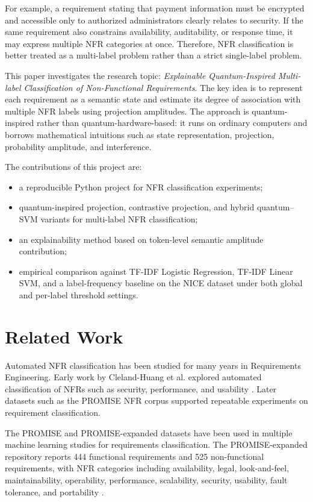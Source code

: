 \documentclass[conference]{IEEEtran}
\begin{document}
For example, a requirement stating that payment information must be encrypted and accessible only to authorized administrators clearly relates to security. If the same requirement also constrains availability, auditability, or response time, it may express multiple NFR categories at once. Therefore, NFR classification is better treated as a multi-label problem rather than a strict single-label problem.

This paper investigates the research topic: \emph{Explainable Quantum-Inspired Multi-label Classification of Non-Functional Requirements}. The key idea is to represent each requirement as a semantic state and estimate its degree of association with multiple NFR labels using projection amplitudes. The approach is quantum-inspired rather than quantum-hardware-based: it runs on ordinary computers and borrows mathematical intuitions such as state representation, projection, probability amplitude, and interference.

The contributions of this project are:
\begin{itemize}
    \item a reproducible Python project for NFR classification experiments;
    \item quantum-inspired projection, contrastive projection, and hybrid quantum--SVM variants for multi-label NFR classification;
    \item an explainability method based on token-level semantic amplitude contribution;
    \item empirical comparison against TF-IDF Logistic Regression, TF-IDF Linear SVM, and a label-frequency baseline on the NICE dataset under both global and per-label threshold settings.
\end{itemize}

\section{Related Work}
Automated NFR classification has been studied for many years in Requirements Engineering. Early work by Cleland-Huang et al. explored automated classification of NFRs such as security, performance, and usability \cite{clelandhuang2007automated}. Later datasets such as the PROMISE NFR corpus supported repeatable experiments on requirement classification.

The PROMISE and PROMISE-expanded datasets have been used in multiple machine learning studies for requirements classification. The PROMISE-expanded repository reports 444 functional requirements and 525 non-functional requirements, with NFR categories including availability, legal, look-and-feel, maintainability, operability, performance, scalability, security, usability, fault tolerance, and portability \cite{mitrevski_promise_exp}.
\end{document}
